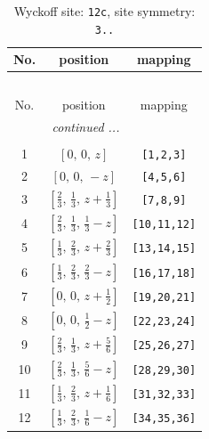 \documentclass[fleqn,8pt]{jsarticle}
\begin{document}
\begin{longtable}{ccc}
\caption{Wyckoff site: {\tt 12c}, site symmetry: {\tt 3..}}
 \\
 \hline \hline
No. & position & mapping \\ \hline \endfirsthead

\multicolumn{2}{l}{\tablename\ \thetable{}} \\
 \hline \hline
No. & position & mapping \\ \hline \endhead

 \hline \hline
\multicolumn{2}{r}{\footnotesize\it continued ...} \\ \endfoot

 \hline \hline
\multicolumn{2}{r}{} \\ \endlastfoot

1 & $\left[ 0,\, 0,\, z \right]$ & {\tt [1,2,3]} \\ \hline
2 & $\left[ 0,\, 0,\, - z \right]$ & {\tt [4,5,6]} \\ \hline
3 & $\left[ \frac{2}{3},\, \frac{1}{3},\, z + \frac{1}{3} \right]$ & {\tt [7,8,9]} \\ \hline
4 & $\left[ \frac{2}{3},\, \frac{1}{3},\, \frac{1}{3} - z \right]$ & {\tt [10,11,12]} \\ \hline
5 & $\left[ \frac{1}{3},\, \frac{2}{3},\, z + \frac{2}{3} \right]$ & {\tt [13,14,15]} \\ \hline
6 & $\left[ \frac{1}{3},\, \frac{2}{3},\, \frac{2}{3} - z \right]$ & {\tt [16,17,18]} \\ \hline
7 & $\left[ 0,\, 0,\, z + \frac{1}{2} \right]$ & {\tt [19,20,21]} \\ \hline
8 & $\left[ 0,\, 0,\, \frac{1}{2} - z \right]$ & {\tt [22,23,24]} \\ \hline
9 & $\left[ \frac{2}{3},\, \frac{1}{3},\, z + \frac{5}{6} \right]$ & {\tt [25,26,27]} \\ \hline
10 & $\left[ \frac{2}{3},\, \frac{1}{3},\, \frac{5}{6} - z \right]$ & {\tt [28,29,30]} \\ \hline
11 & $\left[ \frac{1}{3},\, \frac{2}{3},\, z + \frac{1}{6} \right]$ & {\tt [31,32,33]} \\ \hline
12 & $\left[ \frac{1}{3},\, \frac{2}{3},\, \frac{1}{6} - z \right]$ & {\tt [34,35,36]} \\
\end{longtable}
\renewcommand{\arraystretch}{1.2}
\end{document}
